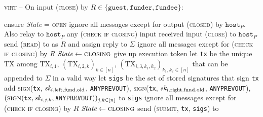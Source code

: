 \begin{center}
  \begin{processbox}{\textsc{virt} -- On input (\textsc{close}) by $R \in
  \{\texttt{guest}, \texttt{funder}, \texttt{fundee}\}$:}
    \begin{algorithmic}[1]
      \State {}
      \label{code:virtual-layer:close:output-guest-punished}
      \State ensure \textit{State} = \textsc{open}
       
      \label{code:virtual-layer:close:if-nested-host}
        \State ignore all messages except for output (\textsc{closed}) by
        $\texttt{host}_P$. Also relay to $\texttt{host}_P$ any (\textsc{check if
        closing}) input received
        \State input (\textsc{close}) to $\texttt{host}_P$
      \EndIf
      \State {}
      \State send (\textsc{read}) to \ledger as $R$ and assign reply to
      $\Sigma$
       
        \State ignore all messages except for (\textsc{check if closing}) by $R$
        \State $\textit{State} \gets \textsc{closing}$
        \State give up execution token 
      \EndIf
      \State let \texttt{tx} be the unique TX among $\mathrm{TX}_{i, 1}$,
      $(\mathrm{TX}_{i, 2, k})_{k \in [n]}$, $(\mathrm{TX}_{i, 3, k_1,
      k_2})_{k_1, k_2 \in [n]}$ that can be appended to $\Sigma$ in a valid way
      \label{code:virtual-layer:close:tx}
      \State let \texttt{sigs} be the set of stored signatures that sign
      \texttt{tx}
      \State add \textsc{sign}(\texttt{tx}, $\textit{sk}_{i, \mathrm{left},
      \mathrm{fund}, \mathrm{old}}$, \texttt{ANYPREVOUT}),
      \textsc{sign}(\texttt{tx}, $\textit{sk}_{i, \mathrm{right}, \mathrm{fund},
      \mathrm{old}}$, \texttt{ANYPREVOUT}), $(\textsc{sign}(\texttt{tx}, \textit{sk}_{i,
      j, k}, \texttt{ANYPREVOUT}))_{j, k \in [n]}$ to \texttt{sigs}
      \State ignore all messages except for (\textsc{check if closing}) by $R$
      \State $\textit{State} \gets \textsc{closing}$
      \State send (\textsc{submit}, \texttt{tx}, \texttt{sigs}) to \ledger
    \end{algorithmic}
  \end{processbox}
  \label{code:virtual-layer:close}
\end{center} \ \\

